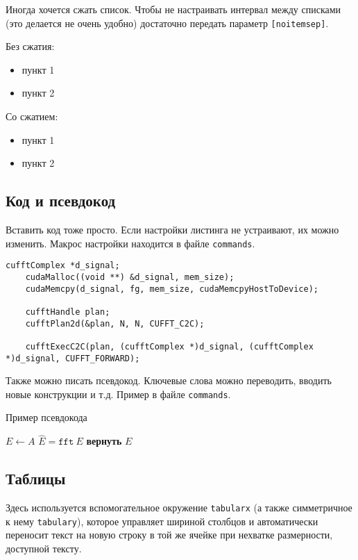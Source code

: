 Иногда хочется сжать список. Чтобы не настраивать интервал между списками (это делается не очень удобно) достаточно передать параметр \texttt{[noitemsep]}.

Без сжатия:
\begin{itemize}
    \item пункт 1
    \item пункт 2
\end{itemize}

Со сжатием:
\begin{itemize}[noitemsep]
    \item пункт 1
    \item пункт 2
\end{itemize}

\subsection{Код и псевдокод}
Вставить код тоже просто. Если настройки листинга не устраивают, их можно изменить. Макрос настройки находится в файле \texttt{commands}.

\begin{lstlisting}[caption={Пример вызова БПФ в библиотеке \texttt{CuFFT}}]
    cufftComplex *d_signal;
    cudaMalloc((void **) &d_signal, mem_size);
    cudaMemcpy(d_signal, fg, mem_size, cudaMemcpyHostToDevice);

    cufftHandle plan;
    cufftPlan2d(&plan, N, N, CUFFT_C2C);

    cufftExecC2C(plan, (cufftComplex *)d_signal, (cufftComplex *)d_signal, CUFFT_FORWARD);
\end{lstlisting}

Также можно писать псевдокод. Ключевые слова можно переводить, вводить новые конструкции и т.д. Пример в файле \texttt{commands}.
\begin{algorithm}[H]
    \caption{Пример псевдокода}
    \begin{algorithmic}[1] %
        \State $E \gets A$
        \State $\hat{E} = \texttt{fft}~E$
        \EndFor
        \State \textbf{вернуть} $E$
        \EndProcedure
    \end{algorithmic}
\end{algorithm}

\subsection{Таблицы}
Здесь используется вспомогательное окружение \texttt{tabularx} (а также симметричное к нему \texttt{tabulary}), которое управляет шириной столбцов и автоматически переносит текст на новую строку в той же ячейке при нехватке размерности, доступной тексту.

